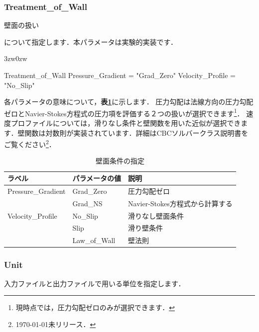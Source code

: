 \pagebreak
\subsubsection{Treatment\_of\_Wall}

\hypertarget{tgt:treatment_of_wall}{壁面の扱い}について指定します．本パラメータは実験的実装です．

\begin{indentation}{3zw}{0zw}

{\small
\begin{program}
  Treatment_of_Wall {
    Pressure_Gradient = "Grad_Zero"
    Velocity_Profile  = "No_Slip"
  }
\end{program}
}

各パラメータの意味について，\textbf{表\ref{tbl:wall_treatment}}に示します．
圧力勾配は法線方向の圧力勾配ゼロとNavier-Stokes方程式の圧力項を評価する２つの扱いが選択できます\footnote{現時点では，圧力勾配ゼロのみが選択できます．}．
速度プロファイルについては，滑りなし条件と壁関数を用いた近似が選択できます．壁関数は対数則が実装されています．詳細はCBCソルバークラス説明書をご覧ください\footnote{\today 未リリース．}．

\begin{table}[htdp]
\caption{壁面条件の指定}
\begin{center}
\small
\begin{tabular}{lll} \toprule
ラベル & パラメータの値 & 説明\\ \midrule
Pressure\_Gradient & Grad\_Zero & 圧力勾配ゼロ\\
 & Grad\_NS & Navier-Stokes方程式から計算する\\ \hline
Velocity\_Profile  & No\_Slip & 滑りなし壁面条件\\
 & Slip & 滑り壁条件\\
 & Law\_of\_Wall & 壁法則\\ \bottomrule
\end{tabular}
\end{center}
\label{tbl:wall_treatment}
\end{table}

\end{indentation}



\pagebreak
\subsubsection{Unit}

入力ファイルと出力ファイルで用いる\hypertarget{tgt:unit}{単位を指定}します．

